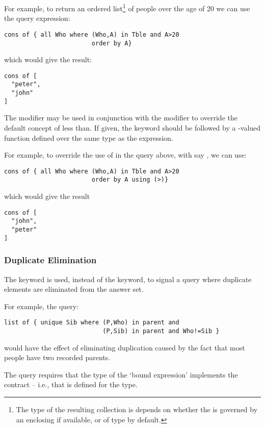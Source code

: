 For example, to return an ordered  list\footnote{The type of the resulting collection is depends on whether the  is governed by an enclosing  if available, or of type  by default.} of people over the age of 20 we can use the query expression:
\begin{lstlisting}
cons of { all Who where (Who,A) in Tble and A>20
                        order by A}
\end{lstlisting}
which would give the result:
\begin{lstlisting}
cons of [
  "peter",
  "john"
]
\end{lstlisting}

The  modifier may be used in conjunction with the  modifier to override the default concept of less than. If given, the  keyword should be followed by a -valued function defined over the same type as the  expression.

For example, to override the use of \q{<} in the  query above, with say \q{>}, we can use:
\begin{lstlisting}
cons of { all Who where (Who,A) in Tble and A>20
                        order by A using (>)}
\end{lstlisting}
which would give the result
\begin{lstlisting}
cons of [
  "john",
  "peter"
]
\end{lstlisting}

\subsubsection{Duplicate Elimination}
\label{duplicateElim}

The  keyword is used, instead of the  keyword, to signal a query where duplicate elements are eliminated from the answer set.

For example, the query:
\begin{lstlisting}
list of { unique Sib where (P,Who) in parent and
                           (P,Sib) in parent and Who!=Sib }
\end{lstlisting}
would have the effect of eliminating duplication caused by the fact that most people have two recorded parents.

The  query requires that the type of the `bound expression' implements the  contract -- i.e., that \q{<} is defined for the type.

